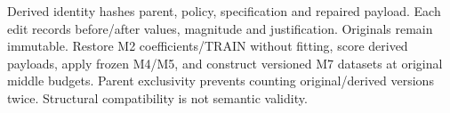 Derived identity hashes parent, policy, specification and repaired payload. Each edit records before/after values, magnitude and justification. Originals remain immutable. Restore M2 coefficients/TRAIN without fitting, score derived payloads, apply frozen M4/M5, and construct versioned M7 datasets at original middle budgets. Parent exclusivity prevents counting original/derived versions twice. Structural compatibility is not semantic validity.
